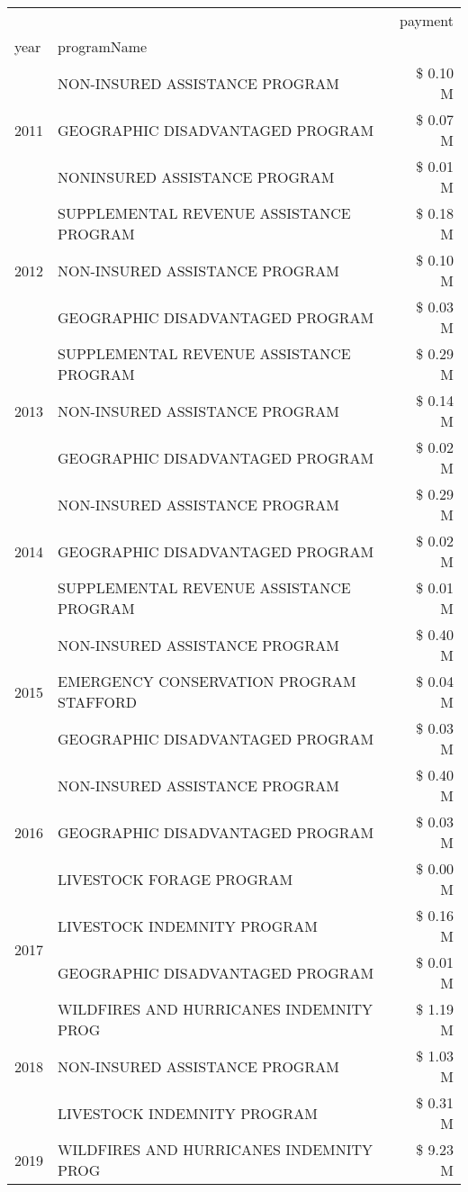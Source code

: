 \begin{tabular}{llr}
\toprule
 &  & payment \\
year & programName &  \\
\midrule
\multirow[t]{3}{*}{2011} & NON-INSURED ASSISTANCE PROGRAM & \$ 0.10 M \\
 & GEOGRAPHIC DISADVANTAGED PROGRAM & \$ 0.07 M \\
 & NONINSURED ASSISTANCE PROGRAM & \$ 0.01 M \\
\cline{1-3}
\multirow[t]{3}{*}{2012} & SUPPLEMENTAL REVENUE ASSISTANCE PROGRAM & \$ 0.18 M \\
 & NON-INSURED ASSISTANCE PROGRAM & \$ 0.10 M \\
 & GEOGRAPHIC DISADVANTAGED PROGRAM & \$ 0.03 M \\
\cline{1-3}
\multirow[t]{3}{*}{2013} & SUPPLEMENTAL REVENUE ASSISTANCE PROGRAM & \$ 0.29 M \\
 & NON-INSURED ASSISTANCE PROGRAM & \$ 0.14 M \\
 & GEOGRAPHIC DISADVANTAGED PROGRAM & \$ 0.02 M \\
\cline{1-3}
\multirow[t]{3}{*}{2014} & NON-INSURED ASSISTANCE PROGRAM & \$ 0.29 M \\
 & GEOGRAPHIC DISADVANTAGED PROGRAM & \$ 0.02 M \\
 & SUPPLEMENTAL REVENUE ASSISTANCE PROGRAM & \$ 0.01 M \\
\cline{1-3}
\multirow[t]{3}{*}{2015} & NON-INSURED ASSISTANCE PROGRAM & \$ 0.40 M \\
 & EMERGENCY CONSERVATION PROGRAM STAFFORD & \$ 0.04 M \\
 & GEOGRAPHIC DISADVANTAGED PROGRAM & \$ 0.03 M \\
\cline{1-3}
\multirow[t]{3}{*}{2016} & NON-INSURED ASSISTANCE PROGRAM & \$ 0.40 M \\
 & GEOGRAPHIC DISADVANTAGED PROGRAM & \$ 0.03 M \\
 & LIVESTOCK FORAGE PROGRAM & \$ 0.00 M \\
\cline{1-3}
\multirow[t]{2}{*}{2017} & LIVESTOCK INDEMNITY PROGRAM & \$ 0.16 M \\
 & GEOGRAPHIC DISADVANTAGED PROGRAM & \$ 0.01 M \\
\cline{1-3}
\multirow[t]{3}{*}{2018} & WILDFIRES AND HURRICANES INDEMNITY PROG & \$ 1.19 M \\
 & NON-INSURED ASSISTANCE PROGRAM & \$ 1.03 M \\
 & LIVESTOCK INDEMNITY PROGRAM & \$ 0.31 M \\
\cline{1-3}
\multirow[t]{3}{*}{2019} & WILDFIRES AND HURRICANES INDEMNITY PROG & \$ 9.23 M \\

\end{tabular}
